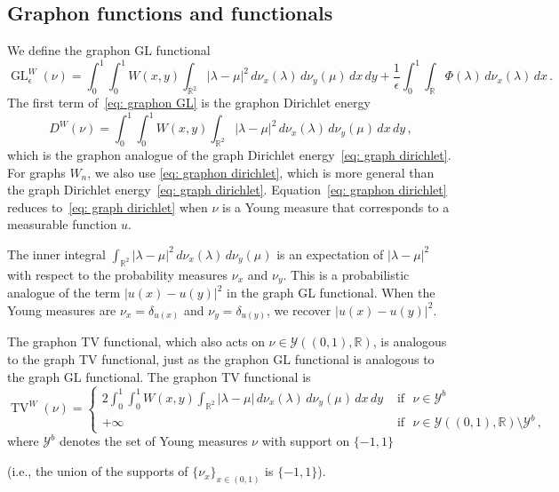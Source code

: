 \documentclass[11pt]{amsart}
\def\R{\mathbb{R}}
\def\ep{\epsilon}
\def\GL{\operatorname{GL}}
\def\TV{\operatorname{TV}}
\numberwithin{equation}{section}
\begin{document}
{%

\subsection{Graphon functions and functionals}\label{sec: graphon functionals}

We define the graphon GL functional  
\begin{equation} \label{eq: graphon GL}
    \GL^W_\ep (\nu) = \int_0^1\int_0^1 W(x,y) \int_{\R^2} |\lambda - \mu|^2 \,d\nu_x(\lambda) \,d\nu_y(\mu)\,dx\,dy  
	+ \frac{1}{\ep}\int_0^1 \int_\R \Phi(\lambda) \,d\nu_x(\lambda) \,dx \,. 
\end{equation} 
The first term of~\eqref{eq: graphon GL} is the graphon Dirichlet energy
\begin{equation}\label{eq: graphon dirichlet}
    D^W(\nu) = \int_0^1\int_0^1 W(x,y) \int_{\R^2} |\lambda - \mu|^2 \,d\nu_x(\lambda) \,d\nu_y(\mu) \,dx\,dy  \,,
\end{equation}
which is the graphon analogue of the graph Dirichlet energy~\eqref{eq: graph dirichlet}. For graphs $W_n$, we also use \eqref{eq: graphon dirichlet}, which is more general than the graph Dirichlet energy~\eqref{eq: graph dirichlet}. Equation~\eqref{eq: graphon dirichlet} reduces to~\eqref{eq: graph dirichlet} when $\nu$ is a Young measure that corresponds to a {measurable} function $u$.

The inner integral $\int_{\R^2} |\lambda - \mu|^2 \,d\nu_x(\lambda) \,d\nu_y(\mu)$ is an expectation of $|\lambda - \mu|^2$ with respect to the probability measures $\nu_x$ and $\nu_y$. This is a probabilistic analogue of the term $|u(x) - u(y)|^2$ in the graph GL functional. When the Young measures are $\nu_x = \delta_{u(x)}$ and $\nu_y = \delta_{u(y)}$, we recover $|u(x) - u(y)|^2$.

The graphon TV functional, which also acts on $\nu \in \mathcal{Y}((0,1),\R)$, is analogous to the graph TV functional, just as the graphon GL functional is analogous to the graph GL functional. The graphon TV functional is
\begin{equation}
    \TV^W(\nu) = \begin{cases} 2 \int_0^1\int_0^1 W(x,y) \int_{\R^2}|\lambda - \mu| \, d\nu_x(\lambda)\,d\nu_y(\mu) \,dx\,dy  &\text{ if } \,\, \nu \in \mathcal{Y}^b \\
    + \infty & \text{ if } \,\, \nu \in \mathcal{Y}((0,1),\R) \setminus \mathcal{Y}^b\,,
    \end{cases} 
    \label{eq: graphon TV}
\end{equation}
where $\mathcal{Y}^b$ denotes the set of Young measures {$\nu$} with support on $\{-1,1\}$ {{(i.e., the union of the supports of $\{\nu_x\}_{x \in (0,1)}$ is $\{-1,1\}$)}.


}}
\end{document}
